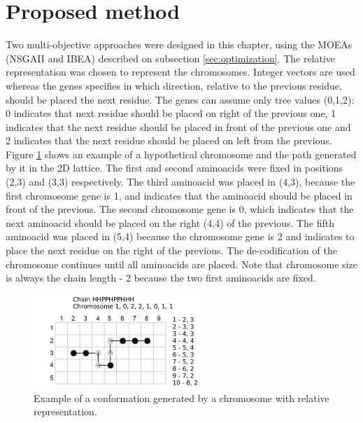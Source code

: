 

\section{Proposed method} \label{sec:proposedMethod}


Two multi-objective approaches were designed in this chapter, using the MOEAs (NSGAII and IBEA) described on subsection \ref{sec:optimization}. The relative representation was chosen to represent the chromosomes. Integer vectors are used whereas the genes specifies in which direction, relative to the previous residue, should be placed the next residue. The genes can assume only tree values (0,1,2): 0 indicates that next residue should be placed on right of the previous one, 1 indicates that the next residue should be placed in front of the previous one and 2 indicates that the next residue should be placed on left from the previous. Figure \ref{fig_sim} shows an example of a hypothetical chromosome and the path generated by it in the 2D lattice. The first and second aminoacids were fixed in positions (2,3) and (3,3) respectively. The third aminoacid was placed in (4,3), because the first chromosome gene is 1, and indicates that the aminoacid should be placed in front of the previous. The second chromosome gene is 0, which indicates that the next aminoacid should be placed on the right (4,4) of the previous. The fifth aminoacid was placed in (5,4) because the chromosome gene is 2 and indicates to place the next residue on the right of the previous. The de-codification of the chromosome continues until all aminoacids are placed. Note that chromosome size is always the chain length - 2 because the two first aminoacids are fixed.


\begin{figure}[ht]
	\centering
	\includegraphics[width=2.5in]{figures/figure3.png}
	\caption{Example of a conformation generated by a chromosome with relative representation.}
	\label{fig_sim}
\end{figure}


